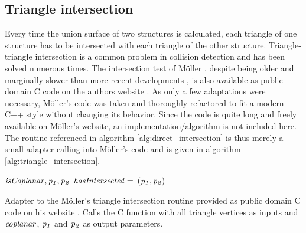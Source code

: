 \subsection{Triangle intersection}
\label{sec:triangle_intersection}

Every time the union surface of two structures is calculated, each triangle of one structure has to be intersected with each triangle of the other structure.
Triangle-triangle intersection is a common problem in collision detection and has been solved numerous times.
The intersection test of Möller \cite{tri_tri_intersection_moller}, despite being older and marginally slower than more recent developments \cite{tri_tri_intersection_2}, is also available as public domain C code on the authors website \cite{tri_tri_intersection_moller_code}.
As only a few adaptations were necessary, Möller's code was taken and thoroughly refactored to fit a modern C++ style without changing its behavior.
Since the code is quite long and freely available on Möller's website, an implementation/algorithm is not included here.
The  routine referenced in algorithm \ref{alg:direct_intersection} is thus merely a small adapter calling into Möller's code and is given in algorithm \ref{alg:triangle_intersection}.

\begin{algorithm}
	\centering
	\begin{algorithmic}[1]
			\State $\mathit{isCoplanar}, \mathit{p_1}, \mathit{p_2}$ 
			\State $\mathit{hasIntersected} =$ 
				\State \Return $(\mathit{p_1}, \mathit{p_2})$ 
			\EndIf
		\EndFunction
	\end{algorithmic}
	\caption{
		Adapter to the Möller's triangle intersection routine provided as public domain C code on his website \cite{tri_tri_intersection_moller_code}.
		Calls the C function  with all triangle vertices as inputs and $\mathit{coplanar}$, $\mathit{p_1}$ and $\mathit{p_2}$ as output parameters.
	}
	\label{alg:triangle_intersection}
\end{algorithm}

